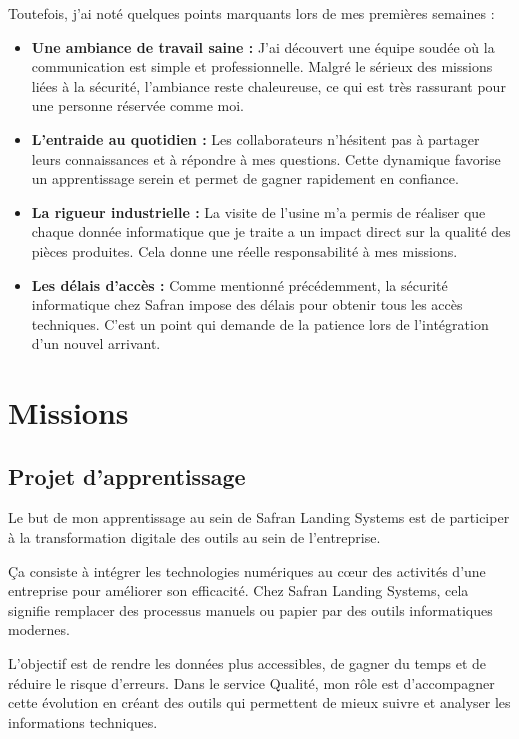 \noindent Toutefois, j'ai noté quelques points marquants lors de mes premières semaines :
\begin{itemize}
  \item \textbf{Une ambiance de travail saine :} J'ai découvert une équipe soudée où la communication est simple et professionnelle. Malgré le sérieux des missions liées à la sécurité, l'ambiance reste chaleureuse, ce qui est très rassurant pour une personne réservée comme moi.
  \item \textbf{L'entraide au quotidien :} Les collaborateurs n'hésitent pas à partager leurs connaissances et à répondre à mes questions. Cette dynamique favorise un apprentissage serein et permet de gagner rapidement en confiance.
  \item \textbf{La rigueur industrielle :} La visite de l'usine m'a permis de réaliser que chaque donnée informatique que je traite a un impact direct sur la qualité des pièces produites. Cela donne une réelle responsabilité à mes missions.
  \item \textbf{Les délais d'accès :} Comme mentionné précédemment, la sécurité informatique chez Safran impose des délais pour obtenir tous les accès techniques. C’est un point qui demande de la patience lors de l'intégration d'un nouvel arrivant.
\end{itemize}

\section*{Missions}

\subsection*{Projet d'apprentissage}
{}
Le but de mon apprentissage au sein de Safran Landing Systems est de participer à la transformation digitale des outils au sein de l'entreprise.

\noindent Ça consiste à intégrer les technologies numériques au cœur des activités d’une entreprise pour améliorer son efficacité. Chez Safran Landing Systems, cela signifie remplacer des processus manuels ou papier par des outils informatiques modernes.

\noindent L'objectif est de rendre les données plus accessibles, de gagner du temps et de réduire le risque d'erreurs. Dans le service Qualité, mon rôle est d'accompagner cette évolution en créant des outils qui permettent de mieux suivre et analyser les informations techniques.


